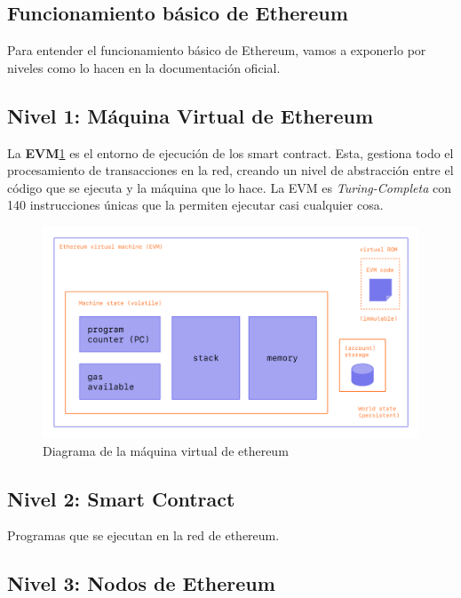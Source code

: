 \subsection{Funcionamiento básico de Ethereum}

Para entender el funcionamiento básico de Ethereum, vamos a exponerlo por niveles como lo hacen en la documentación oficial\cite{etherStack}. 

\subsection{Nivel 1: Máquina Virtual de Ethereum} 

La \textbf{EVM}\ref{fig:evm} es el entorno de ejecución de los smart contract. Esta, gestiona todo el procesamiento de transacciones en la red, creando un nivel de abstracción entre el código que se ejecuta y la máquina que lo hace. La EVM es \emph{Turing-Completa} con 140 instrucciones únicas que la permiten ejecutar casi cualquier cosa. 

\begin{figure}[h!]
  \centering
  \includegraphics[width=0.8\linewidth]{figs/EstadoArte/Ethereum/evm}
  \caption[Diagrama EVM]{Diagrama de la máquina virtual de ethereum}
  \label{fig:evm}
\end{figure}

\subsection{Nivel 2: Smart Contract} 

Programas que se ejecutan en la red de ethereum. 

\subsection{Nivel 3: Nodos de Ethereum}

